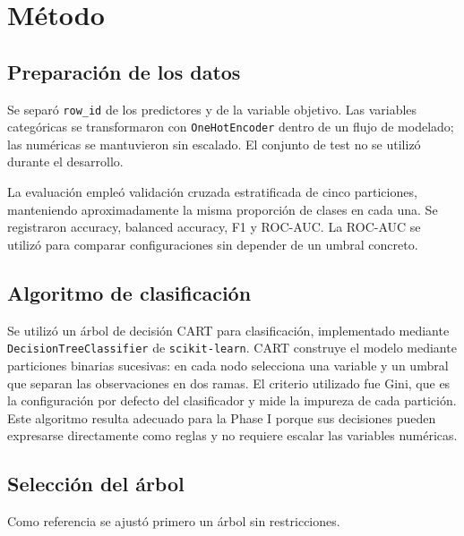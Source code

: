 \chapter{Método} \label{chp:method}


\section{Preparación de los datos}

Se separó \texttt{row_id} de los predictores y de la variable objetivo. Las
variables categóricas se transformaron con \texttt{OneHotEncoder} dentro de un
flujo de modelado; las numéricas se mantuvieron sin escalado. El conjunto de
test no se utilizó durante el desarrollo.

La evaluación empleó validación cruzada estratificada de cinco particiones,
manteniendo aproximadamente la misma proporción de clases en cada una. Se
registraron accuracy, balanced accuracy, F1 y ROC-AUC. La ROC-AUC se utilizó
para comparar configuraciones sin depender de un umbral concreto.

\section{Algoritmo de clasificación}

Se utilizó un árbol de decisión CART para clasificación, implementado mediante
\texttt{DecisionTreeClassifier} de \texttt{scikit-learn}. CART construye el
modelo mediante particiones binarias sucesivas: en cada nodo selecciona una
variable y un umbral que separan las observaciones en dos ramas. El criterio
utilizado fue Gini, que es la configuración por defecto del clasificador y
mide la impureza de cada partición. Este algoritmo resulta adecuado para la
Phase I porque sus decisiones pueden expresarse directamente como reglas y no
requiere escalar las variables numéricas.

\section{Selección del árbol}

Como referencia se ajustó primero un árbol sin restricciones. 


